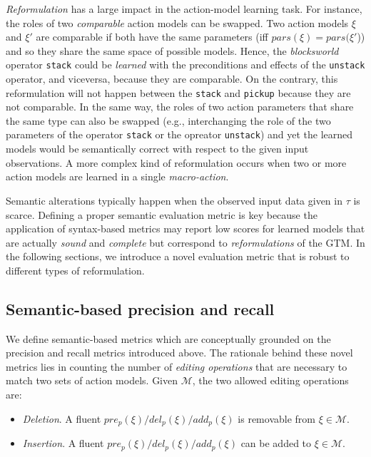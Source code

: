 \emph{Reformulation} has a large impact in the action-model learning task. For instance, the roles of two {\em comparable} action models can be swapped. Two action models $\xi$ and $\xi'$ are comparable if both have the same parameters (iff $pars(\xi)=pars(\xi'$)) and so they share the same space of possible models. Hence, the {\em blocksworld} operator {\small\tt stack} could be {\em learned} with the preconditions and effects of the {\small\tt unstack} operator, and viceversa, because they are comparable. On the contrary, this reformulation will not happen between the {\tt stack} and {\tt pickup} because they are not comparable. In the same way, the roles of two action parameters that share the same type can also be swapped (e.g., interchanging the role of the two parameters of the operator {\small\tt stack} or the opreator {\small\tt unstack}) and yet the learned models would be semantically correct with respect to the given input observations. A more complex kind of reformulation occurs when two or more action models are learned in a single \emph{macro-action}.


Semantic alterations typically happen when the observed input data given in $\tau$ is scarce. Defining a proper semantic evaluation metric is key because the application of syntax-based metrics may report low scores for learned models that are actually {\em sound} and {\em complete} but correspond to {\em reformulations} of the GTM. In the following sections, we introduce a novel evaluation metric that is robust to different types of reformulation.




\subsection{Semantic-based precision and recall}
\label{semantic_precision_recall}

We define semantic-based metrics which are conceptually grounded on the precision and recall metrics introduced above. The rationale behind these novel metrics lies in counting the number of \emph{editing operations} that are necessary to match two sets of action models. Given $\mathcal{M}$, the two allowed editing operations are:

\begin{itemize}
\item {\em Deletion}. A fluent $pre_p(\xi)/del_p(\xi)/add_p(\xi)$ is removable from $\xi\in\mathcal{M}$.
\item {\em Insertion}. A fluent $pre_p(\xi)/del_p(\xi)/add_p(\xi)$ can be added to $\xi\in\mathcal{M}$.
\end{itemize}

